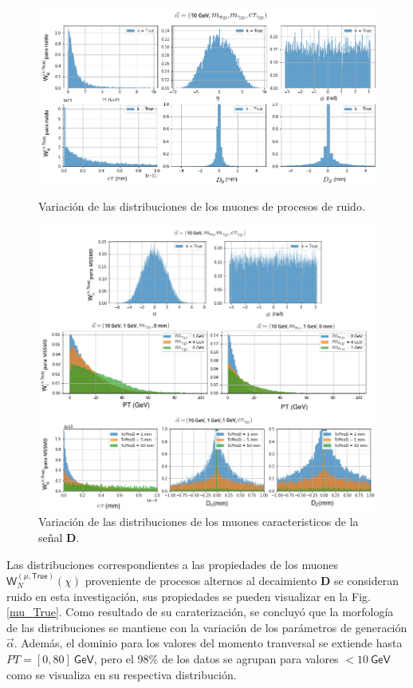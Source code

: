\begin{figure}[!t]
\centering
\includegraphics[width=.9\textwidth]{Simulacion/imagenes/propiedades_True_notMSSM.png}
\caption{Variación de las distribuciones de los muones de procesos de ruido.}
\label{mu_True}

\includegraphics[width=.9\textwidth]{Simulacion/imagenes/propiedades_True_MSSM.png}
\caption{Variación de las distribuciones de los muones caracteristicos de la señal \MSSM\textbf{D}.}
\label{mu_True2}
\end{figure}

Las distribuciones correspondientes a las propiedades de los muones $\textsf{W}^{(\mu,\textsf{True})}_N (\chi)$ proveniente de procesos alternos al decaimiento  \MSSM\textbf{D} se consideran ruido en esta investigación, sus propiedades se pueden visualizar en la Fig. \ref{mu_True}. Como resultado de su caraterización, se concluyó que la morfología de las distribuciones se mantiene con la variación de los parámetros de generación $\vec{\alpha}$. Además, el dominio para los valores del momento tranversal se extiende hasta $PT= [0, 80]~ \textsf{GeV}$, pero el 98\% de los datos se agrupan para valores $<10~\textsf{GeV}$ como se visualiza en su respectiva distribución.



